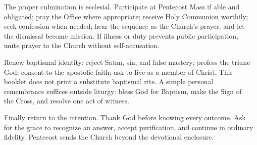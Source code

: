 The proper culmination is ecclesial. Participate at Pentecost Mass if able and obligated; pray the Office where appropriate; receive Holy Communion worthily; seek confession when needed; hear the sequence as the Church's prayer; and let the dismissal become mission. If illness or duty prevents public participation, unite prayer to the Church without self-accusation.

Renew baptismal identity: reject Satan, sin, and false mastery; profess the triune God; consent to the apostolic faith; ask to live as a member of Christ. This booklet does not print a substitute baptismal rite. A simple personal remembrance suffices outside liturgy: bless God for Baptism, make the Sign of the Cross, and resolve one act of witness.

Finally return to the intention. Thank God before knowing every outcome. Ask for the grace to recognize an answer, accept purification, and continue in ordinary fidelity. Pentecost sends the Church beyond the devotional enclosure.




